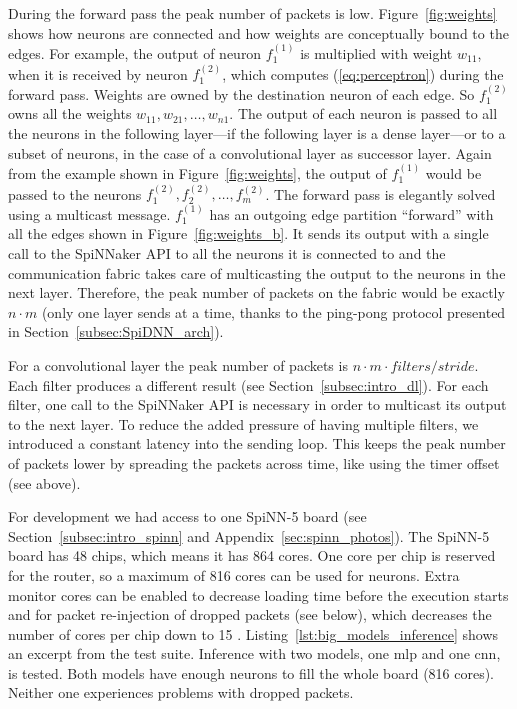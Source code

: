 \documentclass[]{article}
\begin{document}
During the forward pass the peak number of packets is low.
Figure~\ref{fig:weights} shows how neurons are connected and how
weights are conceptually bound to the edges.
For example, the output of neuron $f^{(1)}_1$ is multiplied with
weight $w_{11}$, when it is received by neuron $f^{(2)}_1$,
which computes (\ref{eq:perceptron}) during the forward pass.
Weights are owned by the destination neuron of each edge.
So $f^{(2)}_1$ owns all the weights $w_{11},w_{21},\dots,w_{n1}$.
The output of each neuron is passed to all the neurons in the
following layer---if the following layer is a dense layer---or to a
subset of neurons, in the case of a convolutional layer as successor
layer.
Again from the example shown in Figure~\ref{fig:weights}, the output
of $f^{(1)}_1$ would be passed to the neurons $f^{(2)}_1, f^{(2)}_2,
\dots, f^{(2)}_m$.
The forward pass is elegantly solved using a multicast message.
$f^{(1)}_1$ has an outgoing edge partition ``forward'' with all the
edges shown in Figure~\ref{fig:weights_b}.
It sends its output with a single call to the SpiNNaker API to all
the neurons it is connected to and the communication fabric takes care
of multicasting the output to the neurons in the next layer.
Therefore, the peak number of packets on the fabric would be exactly
$n \cdot m$ (only one layer sends at a time, thanks
to the ping-pong protocol presented in
Section~\ref{subsec:SpiDNN_arch}).

For a convolutional layer the peak number of packets is
$n \cdot m \cdot filters / stride$.
Each filter produces a different result
(see Section~\ref{subsec:intro_dl}).
For each filter, one call to the SpiNNaker API is necessary in order
to multicast its output to the next layer.
To reduce the added pressure of having multiple filters, we introduced
a constant latency into the sending loop.
This keeps the peak number of packets lower by spreading the
packets across time, like using the timer offset (see above).

For development we had access to one SpiNN-5 board
(see Section~\ref{subsec:intro_spinn} and
Appendix~\ref{sec:spinn_photos}).
The SpiNN-5 board has 48 chips, which means it has 864 cores.
One core per chip is reserved for the router, so a maximum of 816
cores can be used for neurons.
Extra monitor cores can be enabled to decrease loading time before the
execution starts and for packet re-injection of dropped packets
(see below), which decreases the number of cores per chip down to 15
\citep{furber_et_al_2020}.
Listing~\ref{lst:big_models_inference} shows an excerpt from the test
suite.
Inference with two models, one \acrshort{mlp} and one \acrshort{cnn}, is tested.
Both models have enough neurons to fill the whole board (816 cores).
Neither one experiences problems with dropped packets.
\end{document}
